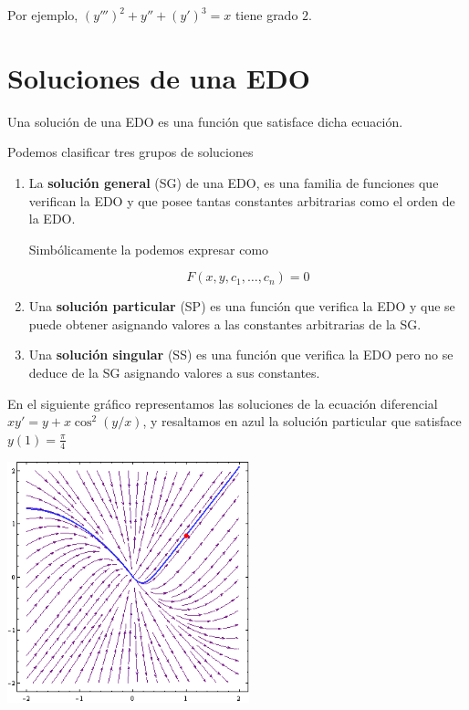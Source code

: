 Por ejemplo, $ (y''')^2 + y'' + (y')^3 = x$ tiene grado $ 2$.

\section{Soluciones de una EDO}

\begin{definition}[Soluciones]
Una solución de una EDO es una función que satisface dicha ecuación.

Podemos clasificar tres grupos de soluciones

\begin{enumerate}

\item La \textbf{solución general} (SG)  de una EDO, es una familia de funciones que verifican la EDO y que posee tantas constantes arbitrarias como el orden de la EDO. 

Simbólicamente la podemos expresar como 

$$F(x,y,c_1, \ldots, c_n) = 0$$

\item Una \textbf{solución particular} (SP)  es una función que verifica la EDO y que se puede obtener asignando valores a las constantes arbitrarias de la SG.

\item Una \textbf{solución singular} (SS)  es una función que verifica la EDO pero no se deduce de la SG asignando valores a sus constantes.
\end{enumerate}

\end{definition}

\begin{example}

En el siguiente gráfico representamos las soluciones de la ecuación diferencial $ x y' = y + x \cos^2(y/x) $, y resaltamos en azul la solución particular que satisface $y(1) = \frac{\pi}{4}$

\end{example}

\begin{center}
\includegraphics[width=7cm]{images/04_analisis2/tp12_ej1c.png}
\end{center}


